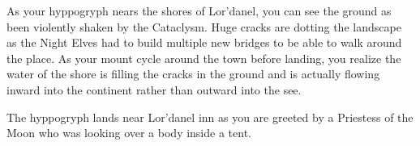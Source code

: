 As your hyppogryph nears the shores of Lor'danel, you can see the ground as been violently shaken by the Cataclysm. Huge cracks are dotting the landscape as the Night Elves had to build multiple new bridges to be able to walk around the place. As your mount cycle around the town before landing, you realize the water of the shore is filling the cracks in the ground and is actually flowing inward into the continent rather than outward into the see.

The hyppogryph lands near Lor'danel inn as you are greeted by a Priestess of the Moon who was looking over a body inside a tent.


